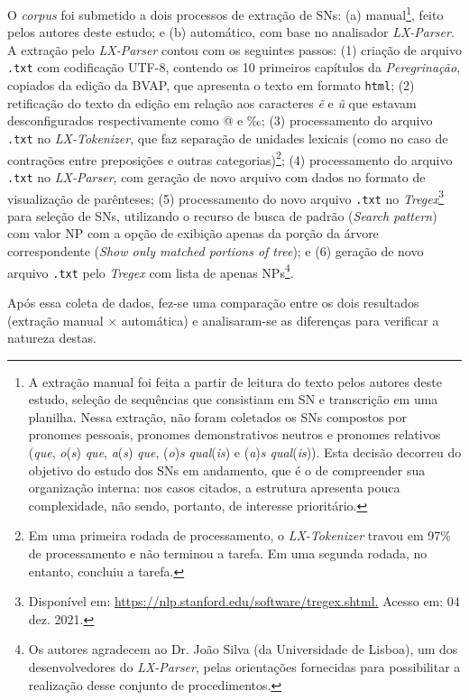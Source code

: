 \documentclass[portuguese]{textolivre}
\begin{document}
O \textit{corpus} foi submetido a dois processos de extração de SNs: (a) manual\footnote{A extração manual foi feita a partir de leitura do texto pelos autores deste estudo, seleção de sequências que consistiam em SN e transcrição em uma planilha. Nessa extração, não foram coletados os SNs compostos por pronomes pessoais, pronomes demonstrativos neutros e pronomes relativos (\textit{que}, \textit{o}(\textit{s}) \textit{que}, \textit{a}(\textit{s}) \textit{que}, (\textit{o})\textit{s} \textit{qual}(\textit{is}) e (\textit{a})\textit{s qual}(\textit{is})). Esta decisão decorreu do objetivo do estudo dos SNs em andamento, que é o de compreender sua organização interna: nos casos citados, a estrutura apresenta pouca complexidade, não sendo, portanto, de interesse prioritário.}, feito pelos autores deste estudo; e (b) automático, com base no analisador \textit{LX-Parser}. A extração pelo \textit{LX-Parser} contou com os seguintes passos: (1) criação de arquivo \texttt{.txt} com codificação UTF-8, contendo os 10 primeiros capítulos da \textit{Peregrinação}, copiados da edição da BVAP, que apresenta o texto em formato \texttt{html}; (2) retificação do texto da edição em relação aos caracteres \textit{ẽ} e \textit{ũ} que estavam desconfigurados respectivamente como @ e ‰; (3) processamento do arquivo \texttt{.txt} no \textit{LX-Tokenizer}, que faz separação de unidades lexicais (como no caso de contrações entre preposições e outras categorias)\footnote{Em uma primeira rodada de processamento, o \textit{LX-Tokenizer} travou em 97\% de processamento e não terminou a tarefa. Em uma segunda rodada, no entanto, concluiu a tarefa.}; (4) processamento do arquivo \texttt{.txt} no \textit{LX-Parser}, com geração de novo arquivo com dados no formato de visualização de parênteses; (5) processamento do novo arquivo \texttt{.txt} no \textit{Tregex}\footnote{Disponível em: \url{https://nlp.stanford.edu/software/tregex.shtml.} Acesso em: 04 dez. 2021.} para seleção de SNs, utilizando o recurso de busca de padrão (\textit{Search pattern}) com valor NP com a opção de exibição apenas da porção da árvore correspondente (\textit{Show only matched portions of tree}); e (6) geração de novo arquivo \texttt{.txt} pelo \textit{Tregex} com lista de apenas NPs\footnote{Os autores agradecem ao Dr. João Silva (da Universidade de Lisboa), um dos desenvolvedores do \textit{LX-Parser}, pelas orientações fornecidas para possibilitar a realização desse conjunto de procedimentos.}.

Após essa coleta de dados, fez-se uma comparação entre os dois resultados (extração manual × automática) e analisaram-se as diferenças para verificar a natureza destas.
\end{document}
